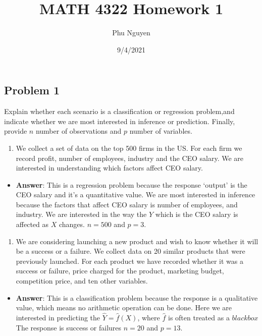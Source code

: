 \documentclass[
]{article}
\title{MATH 4322 Homework 1}
\author{Phu Nguyen}
\date{9/4/2021}
\providecommand{\tightlist}{%
  \setlength{\itemsep}{0pt}\setlength{\parskip}{0pt}}
\begin{document}
\maketitle

\hypertarget{problem-1}{%
\subsection{Problem 1}\label{problem-1}}

Explain whether each scenario is a classification or regression
problem,and indicate whether we are most interested in inference or
prediction. Finally, provide \(n\) number of observations and \(p\)
number of variables.

\begin{enumerate}
\def\labelenumi{(\alph{enumi})}
\tightlist
\item
  We collect a set of data on the top 500 firms in the US. For each firm
  we record profit, number of employees, industry and the CEO salary. We
  are interested in understanding which factors affect CEO salary.
\end{enumerate}

\begin{itemize}
\tightlist
\item
  \textbf{Answer}: This is a regression problem because the response
  `output' is the CEO salary and it's a quantitative value. We are most
  interested in inference because the factors that affect CEO salary is
  number of employees, and industry. We are interested in the way the
  \(Y\) which is the CEO salary is affected as \(X\) changes.
  \(n = 500\) and \(p = 3\).
\end{itemize}

\begin{enumerate}
\def\labelenumi{(\alph{enumi})}
\setcounter{enumi}{1}
\tightlist
\item
  We are considering launching a new product and wish to know whether it
  will be a success or a failure. We collect data on 20 similar products
  that were previously launched. For each product we have recorded
  whether it was a success or failure, price charged for the product,
  marketing budget, competition price, and ten other variables.
\end{enumerate}

\begin{itemize}
\tightlist
\item
  \textbf{Answer}: This is a classification problem because the response
  is a qualitative value, which means no arithmetic operation can be
  done. Here we are interested in predicting the
  \(\hat{Y} = \hat{f}(X)\), where \(\hat{f}\) is often treated as a
  \(black box\) The response is success or failures \(n = 20\) and
  \(p = 13\).
\end{itemize}
\end{document}
